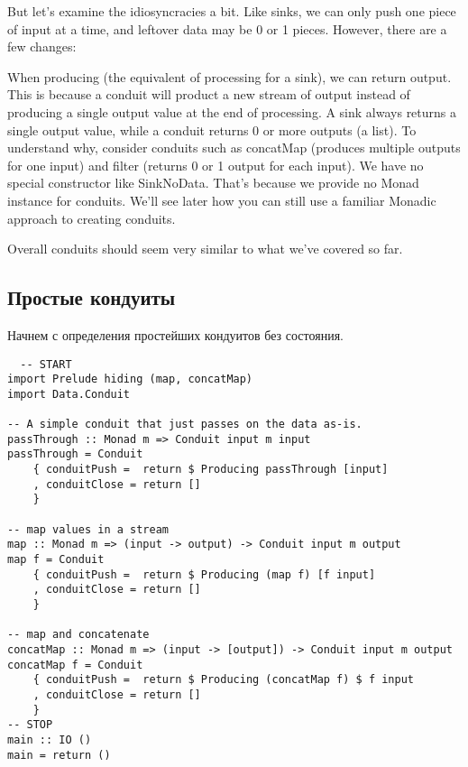 But let's examine the idiosyncracies a bit. Like sinks, we can only push one piece of
input at
a time, and leftover data may be 0 or 1 pieces. However, there are a few changes:

  
When producing (the equivalent of processing for a sink), we can return output. This is
because a conduit will product a new stream of output instead of producing a single
output
value
at the end of processing.
A sink always returns a single output value, while a conduit returns 0 or more outputs
(a
list). To understand why, consider conduits such as concatMap (produces
multiple outputs for one input) and filter (returns 0 or 1 output for each
input).
We have no special constructor like SinkNoData. That's because we provide no
Monad instance for conduits. We'll see later how you can still use a familiar
Monadic approach to creating conduits.
  
Overall conduits should seem very similar to what we've covered so far.

\subsection{Простые кондуиты}

Начнем с определения простейших кондуитов без состояния.
\begin{lstlisting}
  -- START
import Prelude hiding (map, concatMap)
import Data.Conduit

-- A simple conduit that just passes on the data as-is.
passThrough :: Monad m => Conduit input m input
passThrough = Conduit
    { conduitPush =  return $ Producing passThrough [input]
    , conduitClose = return []
    }

-- map values in a stream
map :: Monad m => (input -> output) -> Conduit input m output
map f = Conduit
    { conduitPush =  return $ Producing (map f) [f input]
    , conduitClose = return []
    }

-- map and concatenate
concatMap :: Monad m => (input -> [output]) -> Conduit input m output
concatMap f = Conduit
    { conduitPush =  return $ Producing (concatMap f) $ f input
    , conduitClose = return []
    }
-- STOP
main :: IO ()
main = return ()
\end{lstlisting}

